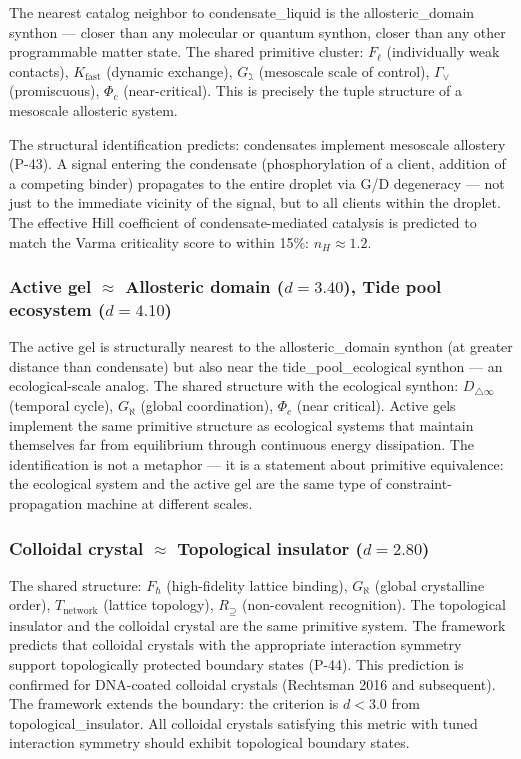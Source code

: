 \documentclass[12pt,a4paper]{article}
\begin{document}
The nearest catalog neighbor to condensate\_liquid is the allosteric\_domain synthon --- closer than any molecular or quantum synthon, closer than any other programmable matter state. The shared primitive cluster: $F_\ell$ (individually weak contacts), $K_\text{fast}$ (dynamic exchange), $G_\gimel$ (mesoscale scale of control), $\Gamma_\vee$ (promiscuous), $\Phi_c$ (near-critical). This is precisely the tuple structure of a mesoscale allosteric system.

The structural identification predicts: condensates implement mesoscale allostery (P-43). A signal entering the condensate (phosphorylation of a client, addition of a competing binder) propagates to the entire droplet via G/D degeneracy --- not just to the immediate vicinity of the signal, but to all clients within the droplet. The effective Hill coefficient of condensate-mediated catalysis is predicted to match the Varma criticality score to within 15\%: $n_H \approx 1.2$.

\subsubsection{Active gel $\approx$ Allosteric domain ($d = 3.40$), Tide pool ecosystem ($d = 4.10$)}

The active gel is structurally nearest to the allosteric\_domain synthon (at greater distance than condensate) but also near the tide\_pool\_ecological synthon --- an ecological-scale analog. The shared structure with the ecological synthon: $D_{\triangle\infty}$ (temporal cycle), $G_\aleph$ (global coordination), $\Phi_c$ (near critical). Active gels implement the same primitive structure as ecological systems that maintain themselves far from equilibrium through continuous energy dissipation. The identification is not a metaphor --- it is a statement about primitive equivalence: the ecological system and the active gel are the same type of constraint-propagation machine at different scales.

\subsubsection{Colloidal crystal $\approx$ Topological insulator ($d = 2.80$)}

The shared structure: $F_\hbar$ (high-fidelity lattice binding), $G_\aleph$ (global crystalline order), $T_\text{network}$ (lattice topology), $R_{\supseteq}$ (non-covalent recognition). The topological insulator and the colloidal crystal are the same primitive system. The framework predicts that colloidal crystals with the appropriate interaction symmetry support topologically protected boundary states (P-44). This prediction is confirmed for DNA-coated colloidal crystals (Rechtsman 2016 and subsequent). The framework extends the boundary: the criterion is $d < 3.0$ from topological\_insulator. All colloidal crystals satisfying this metric with tuned interaction symmetry should exhibit topological boundary states.
\end{document}

